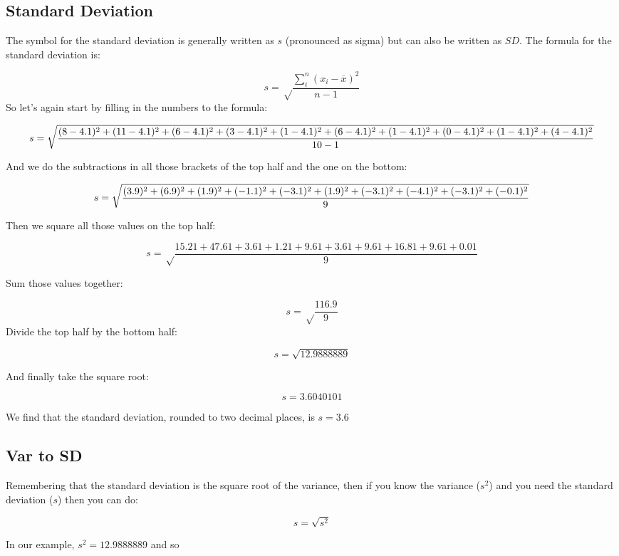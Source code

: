 \documentclass[
  oneside]{book}
\begin{document}
\hypertarget{standard-deviation}{%
\subsection{Standard Deviation}\label{standard-deviation}}

The symbol for the standard deviation is generally written as \(s\) (pronounced as sigma) but can also be written as \(SD\). The formula for the standard deviation is:

\[s = \sqrt\frac{\sum_i^n(x_{i} - \overline{x})^2}{n-1}\]
So let's again start by filling in the numbers to the formula:

\[s = \sqrt\frac{(8 - 4.1)^2 + (11 - 4.1)^2 + (6 - 4.1)^2 + (3 - 4.1)^2 + (1 - 4.1)^2 + \\(6 - 4.1)^2 + (1 - 4.1)^2 + (0 - 4.1)^2 + (1 - 4.1)^2 + (4 - 4.1)^2}{10 - 1}\]

And we do the subtractions in all those brackets of the top half and the one on the bottom:

\[s = \sqrt\frac{(3.9)^2 + (6.9)^2 + (1.9)^2 + (-1.1)^2 + (-3.1)^2 + \\(1.9)^2 + (-3.1)^2 + (-4.1)^2 + (-3.1)^2 + (-0.1)^2}{9}\]

Then we square all those values on the top half:

\[s = \sqrt\frac{15.21 + 47.61+ 3.61+ 1.21+ 9.61+ 3.61+ 9.61+ 16.81+ 9.61+ 0.01}{9}\]

Sum those values together:

\[s = \sqrt\frac{116.9}{9}\]
Divide the top half by the bottom half:

\[s = \sqrt{12.9888889}\]

And finally take the square root:

\[s = 3.6040101\]

We find that the standard deviation, rounded to two decimal places, is \textbf{\(s = 3.6\)}

\hypertarget{var-to-sd}{%
\subsection{Var to SD}\label{var-to-sd}}

Remembering that the standard deviation is the square root of the variance, then if you know the variance (\(s^2\)) and you need the standard deviation (\(s\)) then you can do:

\[s = \sqrt{s^2}\]

In our example, \(s^2 = 12.9888889\) and so
\end{document}
